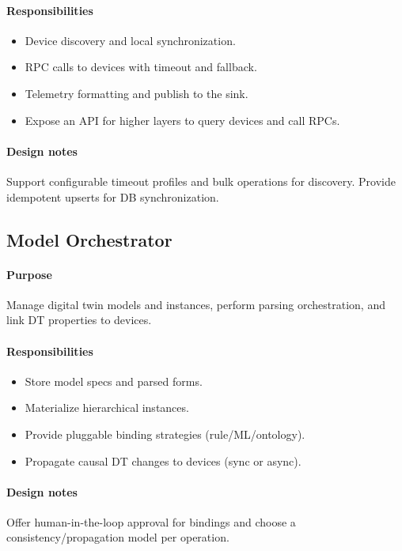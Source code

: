\documentclass[11pt,a4paper]{article}
\begin{document}
\paragraph{Responsibilities}
\begin{itemize}
  \item Device discovery and local synchronization.
  \item RPC calls to devices with timeout and fallback.
  \item Telemetry formatting and publish to the sink.
  \item Expose an API for higher layers to query devices and call RPCs.
\end{itemize}

\paragraph{Design notes}
Support configurable timeout profiles and bulk operations for discovery. Provide idempotent upserts for DB synchronization.

\subsection{Model Orchestrator}
\paragraph{Purpose}
Manage digital twin models and instances, perform parsing orchestration, and link DT properties to devices.

\paragraph{Responsibilities}
\begin{itemize}
  \item Store model specs and parsed forms.
  \item Materialize hierarchical instances.
  \item Provide pluggable binding strategies (rule/ML/ontology).
  \item Propagate causal DT changes to devices (sync or async).
\end{itemize}

\paragraph{Design notes}
Offer human-in-the-loop approval for bindings and choose a consistency/propagation model per operation.
\end{document}
